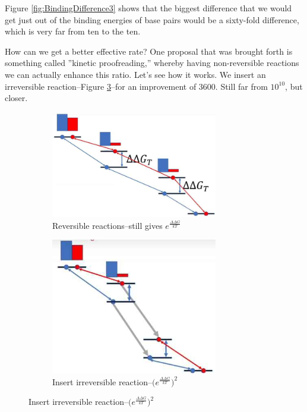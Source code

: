 \documentclass[]{article}
\begin{document}
Figure \ref{fig:BindingDifference3} shows that the biggest difference that we would get
just out of the binding energies of base pairs would be a sixty-fold difference,
which is very far from ten to the ten.

How can we get a better effective rate? One proposal that was brought forth is something called ''kinetic proofreading,'' whereby having non-reversible reactions we can actually enhance this ratio. Let's see how it works. We insert an irreversible reaction--Figure \ref{fig:kineticProofreading2}--for an improvement of 3600. Still far from $10^{10}$, but closer.
\begin{figure}[H]
	\caption{Kinetic Proofreading}
	\begin{subfigure}[t]{0.45\textwidth}
		\caption{Reversible reactions--still gives $e^\frac{\Delta \Delta G}{kT}$}\label{fig:kineticProofreading}
		\includegraphics[width=0.8\textwidth]{kineticProofreading}
	\end{subfigure}
	\begin{subfigure}[t]{0.45\textwidth}
		\caption{Insert irreversible reaction--$\big(e^\frac{\Delta \Delta G}{kT}\big)^2$}\label{fig:kineticProofreading2}
		\includegraphics[width=0.8\textwidth]{kineticProofreading2}
	\end{subfigure}
\end{figure}
\end{document}
